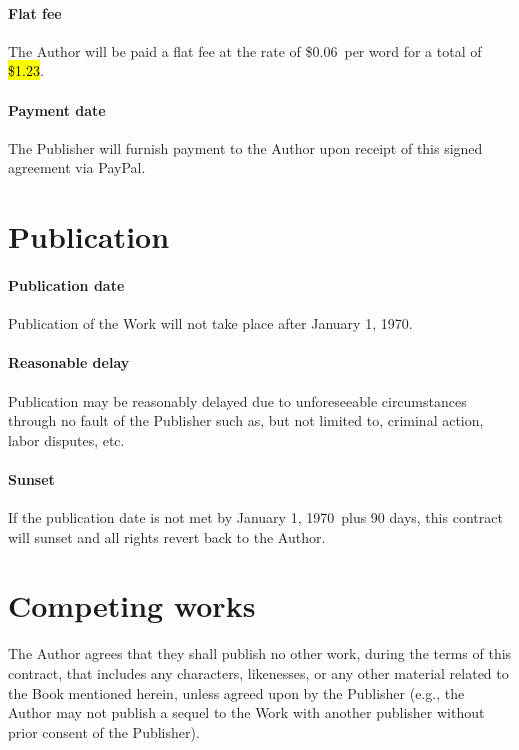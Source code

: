 \documentclass[12pt,letterpaper,oneside]{article}
\def\Fee{1.23}
\def\Rate{0.06}
\def\PaymentMechanism{PayPal} %
\def\PublicationDate{January 1, 1970}
\begin{document}
\paragraph{Flat fee}

The Author will be paid a flat fee at the rate of \$\Rate\ per word for a total of \hl{\$\Fee}.

\paragraph{Payment date}

The Publisher will furnish payment to the Author upon receipt of this signed agreement via \PaymentMechanism.

\section{Publication}

\paragraph{Publication date}

Publication of the Work will not take place after \PublicationDate.

\paragraph{Reasonable delay}

Publication may be reasonably delayed due to unforeseeable circumstances through no fault of the Publisher such as, but not limited to, criminal action, labor disputes, etc.

\paragraph{Sunset}

If the publication date is not met by \PublicationDate\ plus 90 days, this contract will sunset and all rights revert back to the Author.

\section{Competing works}

The Author agrees that they shall publish no other work, during the terms of this contract, that includes any characters, likenesses, or any other material related to the Book mentioned herein, unless agreed upon by the Publisher (e.g., the Author may not publish a sequel to the Work with another publisher without prior consent of the Publisher).
\end{document}

